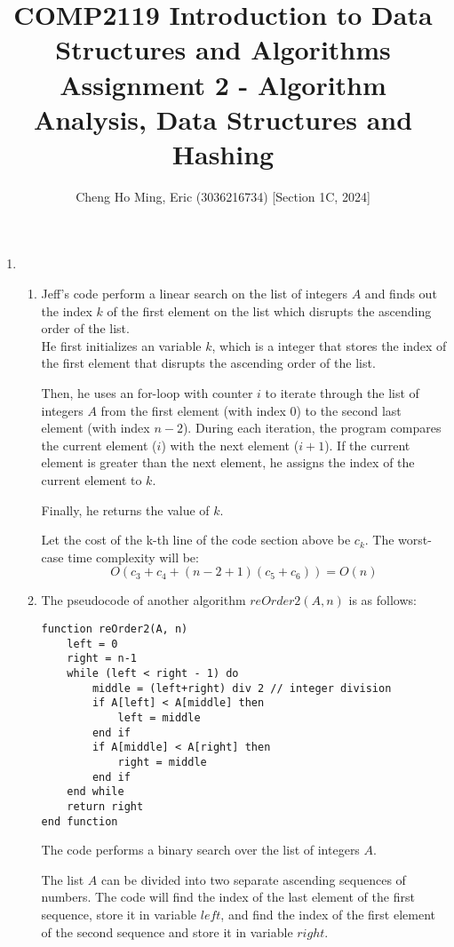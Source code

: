 \documentclass{article}
\title{COMP2119 Introduction to Data Structures and Algorithms
Assignment 2 - Algorithm Analysis, Data Structures and Hashing}
\author{Cheng Ho Ming, Eric (3036216734) [Section 1C, 2024]}
\begin{document}
\maketitle

\begin{enumerate}
\item
    \begin{enumerate}[label=(\alph*)]
        \item
        Jeff's code perform a linear search on the list of integers $A$ and finds out the index $k$ of the first element on the list which disrupts the ascending order of the list. \\
        He first initializes an variable $k$, which is a integer that stores the index of the first element that disrupts the ascending order of the list.

        Then, he uses an for-loop with counter $i$ to iterate through the list of integers $A$ from the first element (with index $0$) to the second last element (with index $n-2$). During each iteration, the program compares the current element ($i$) with the next element ($i+1$). If the current element is greater than the next element, he assigns the index of the current element to $k$.

        Finally, he returns the value of $k$.

        Let the cost of the k-th line of the code section above be $c_k$. The worst-case time complexity will be:
        \[
        O(c_3+c_4+(n-2+1)(c_5+c_6)) = O(n)
        \]

        \item The pseudocode of another algorithm $reOrder2(A,n)$ is as follows:
        \begin{verbatim}
function reOrder2(A, n)
    left = 0
    right = n-1
    while (left < right - 1) do
        middle = (left+right) div 2 // integer division
        if A[left] < A[middle] then
            left = middle
        end if
        if A[middle] < A[right] then
            right = middle
        end if
    end while
    return right
end function
        \end{verbatim}
        The code performs a binary search over the list of integers $A$.

        The list $A$ can be divided into two separate ascending sequences of numbers. The code will find the index of the last element of the first sequence, store it in variable $left$, and find the index of the first element of the second sequence and store it in variable $right$.


\end{enumerate}
\end{enumerate}
\end{document}
